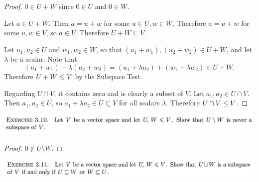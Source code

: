 \documentclass[12pt]{article}
\begin{document}
\begin{proof}
  $0 \in U + W$ since $0 \in U$ and $0 \in W$.

  Let $a \in U + W$. Then $a = u + w$ for some $u \in U, w \in W$. Therefore
  $a = u + w$ for some $u, w \in V$, so $a \in V$. Therefore
  $U + W \subseteq V$.

  Let $u_1, u_2 \in U$ and $w_1, w_2 \in W$, so that
  $(u_1 + w_1), (u_2 + w_2) \in U + W$, and let $\lambda$ be a scalar. Note
  that
  $$
  (u_1 + w_1) + \lambda(u_2 + w_2) = (u_1 + \lambda u_2) + (w_1 + \lambda w_2) \in U + W.
  $$
  Therefore $U + W \leq V$ by the Subspace Test.

  Regarding $U \cap V$, it contains zero and is clearly a subset of $V$. Let
  $a_1, a_2 \in U \cap V$. Then $a_1, a_2 \in U$, so
  $a_1 + \lambda a_2 \in U \subseteq V$ for all scalars $\lambda$. Therefore
  $U \cap V \leq V$.
\end{proof}

\begin{mdframed}
\includegraphics[width=400pt]{img/oxford-prelims-M1-linear-algebra-3-10.png}
\end{mdframed}

\begin{proof}
  $0 \notin U \setminus W$.
\end{proof}

\begin{mdframed}
\includegraphics[width=400pt]{img/oxford-prelims-M1-linear-algebra-3-11.png}
\end{mdframed}
\end{document}
